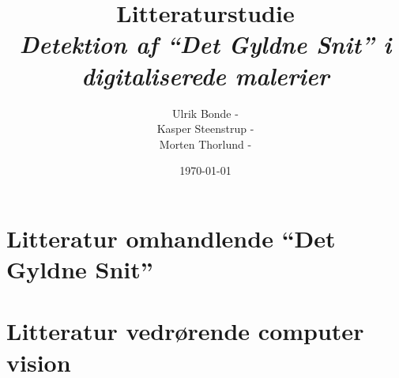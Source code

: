 \documentclass[a4paper, 10pt, danish, final]{article}
\title{Litteraturstudie\\{\Large \emph{Detektion af ``Det Gyldne Snit'' i digitaliserede malerier}}}
\author{Ulrik Bonde - \mailto{bonde@diku.dk}\\
Kasper Steenstrup - \mailto{khsj@diku.dk}\\
Morten Thorlund - \mailto{thorlund@diku.dk}}
\date{\today}
\begin{document}
\maketitle
\thispagestyle{empty}



\section*{Litteratur omhandlende ``Det Gyldne Snit''}


\section*{Litteratur vedrørende computer vision}


\end{document}
